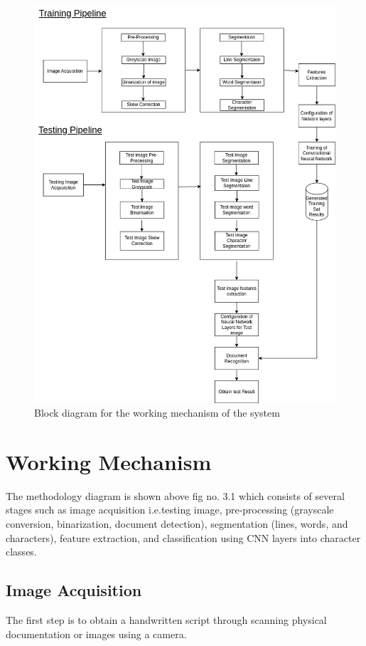 \section*{}
\begin{figure}[h]
    \centering
        \includegraphics[scale=0.46]{images/Methodology.png}
        \caption{Block diagram for the working mechanism of the system}%
    \end{figure}
\newpage
\section{Working Mechanism}
The methodology diagram is shown above fig no. 3.1 which consists of several stages such as image acquisition i.e.testing image, pre-processing (grayscale conversion, binarization, document detection), segmentation (lines, words, and characters), feature extraction, and classification using CNN layers into\cite{Ishfar2020DocumentDetection} character classes.
\subsection{Image Acquisition}
The first step is to obtain a handwritten script through  scanning physical documentation or images using a camera.

